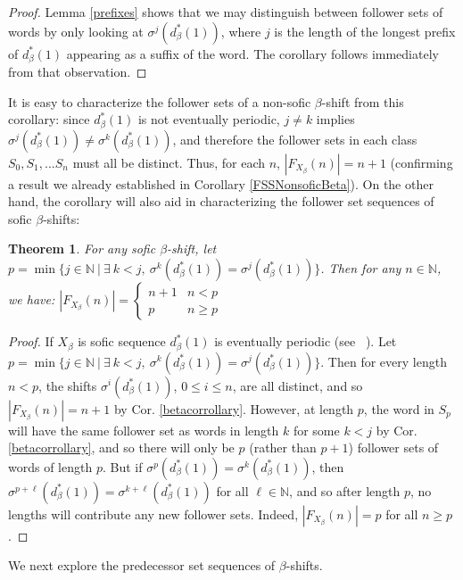 \documentclass{amsart}
\newtheorem{theorem}{Theorem}[section]
\theoremstyle{definition}
\numberwithin{equation}{section}
\begin{document}
\begin{proof} Lemma \ref{prefixes} shows that we may distinguish between follower sets of words by only looking at $\sigma^j(d_\beta^* (1))$, where $j$ is the length of the longest prefix of $d_\beta^* (1)$ appearing as a suffix of the word. The corollary follows immediately from that observation.
\end{proof}

It is easy to characterize the follower sets of a non-sofic $\beta$-shift from this corollary: since $d_\beta^* (1)$ is not eventually periodic, $j \neq k$ implies $\sigma^j(d_\beta^* (1)) \neq \sigma^k(d_\beta^* (1))$, and therefore the follower sets in each class $S_0, S_1, ... S_n$ must all be distinct. Thus, for each $n$, $|F_{X_\beta}(n)| = n+1$ (confirming a result we already established in Corollary \ref{FSSNonsoficBeta}). On the other hand, the corollary will also aid in characterizing the follower set sequences of sofic $\beta$-shifts: 

\begin{theorem}\label{sofic beta}
For any sofic $\beta$-shift, let $p = \min\{j \in \mathbb{N} ~ | ~ \exists ~ k<j, \ \sigma^k(d_\beta^* (1)) = \sigma^j(d_\beta^* (1)) \}$. Then for any $n \in \mathbb{N}$, we have: $|F_{X_\beta}(n)| =  \begin{cases} 
      n+1 & n < p \\
      p & n \geq p 
   \end{cases}
$
\end{theorem}
\begin{proof}
If $X_\beta$ is sofic sequence $d_\beta^* (1)$ is eventually periodic (see ~\cite{Blanchard}). Let $p = \min\{j \in \mathbb{N} ~ | ~ \exists ~ k<j, \ \sigma^k(d_\beta^* (1)) = \sigma^j(d_\beta^* (1)) \}$. Then for every length $n < p$, the shifts $\sigma^i(d_\beta^* (1))$, $0 \leq i \leq n$, are all distinct, and so $|F_{X_\beta}(n)| = n+1$ by Cor. \ref{betacorrollary}. However, at length $p$, the word in $S_p$ will have the same follower set as words in length $k$ for some $k < j$ by Cor. \ref{betacorrollary}, and so there will only be $p$ (rather than $p+1$) follower sets of words of length $p$. But if $\sigma^p(d_\beta^* (1)) = \sigma^k(d_\beta^* (1))$, then $\sigma^{p+\ell}(d_\beta^* (1)) = \sigma^{k+\ell}(d_\beta^* (1))$ for all $\ell \in \mathbb{N}$, and so after length $p$, no lengths will contribute any new follower sets. Indeed, $|F_{X_\beta}(n)| = p$ for all $n \geq p$.
\end{proof}

We next explore the predecessor set sequences of $\beta$-shifts. 
\end{document}
